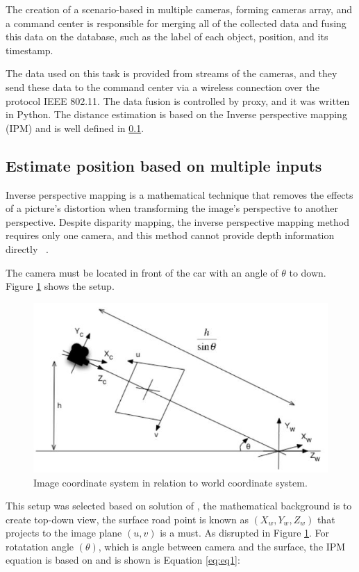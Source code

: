  The creation of a scenario-based in multiple cameras, forming cameras array, and a command center is responsible for merging all of the collected data and fusing this data on the database, such as the label of each object, position, and its timestamp. 

The data used on this task is provided from streams of the cameras, and they send these data to the command center via a wireless connection over the protocol IEEE 802.11. The data fusion is controlled by proxy, and it was written in Python. The distance estimation is based on the Inverse perspective mapping (IPM) and is well defined in \ref{ipm}.


\subsection{Estimate position based on multiple inputs}\label{ipm}
Inverse perspective mapping is a mathematical technique that removes the effects of a picture's distortion when transforming the image's perspective to another perspective. Despite disparity mapping, the inverse perspective mapping method requires only one camera, and this method cannot provide depth information directly ~\cite{Tuohy2010}.

The camera must be located in front of the car with an angle of \(\theta\) to down. Figure \ref{fig:ImageRelationSystem} shows the setup.

\begin{figure}[h]
\centering
\includegraphics[scale=0.5]{imagens/Inverse Perspective Mapping.JPG}
\caption{Image coordinate system in relation to world coordinate
system.}
\label{fig:ImageRelationSystem}
\end{figure}
\par


This setup was selected based on solution of \cite{Wongsaree2018}, the mathematical background is to create top-down view, the surface road point is known as $(X_w,Y_w,Z_w)$
that projects to the image plane $(u,v)$ is a must. As disrupted in Figure \ref{fig:ImageRelationSystem}. For rotatation angle $(\theta)$, which is angle between camera and the surface, the IPM equation is based on \cite{7759904} and is shown is Equation \ref{eq:eq1}:

